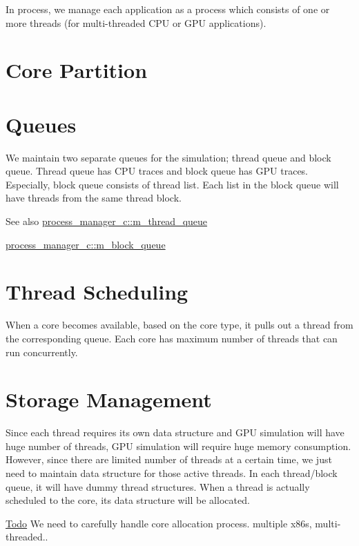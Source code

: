 In process, we manage each application as a process which consists of one or more threads (for multi-\/threaded CPU or GPU applications).\hypertarget{process_process_core}{}\section{Core Partition}\label{process_process_core}
\hypertarget{process_process_queue}{}\section{Queues}\label{process_process_queue}
We maintain two separate queues for the simulation; thread queue and block queue. Thread queue has CPU traces and block queue has GPU traces. Especially, block queue consists of thread list. Each list in the block queue will have threads from the same thread block. \begin{DoxySeeAlso}{See also}
\hyperlink{classprocess__manager__c_a0fa9dc97ed1a88aadc63b0a82ef24896}{process\_\-manager\_\-c::m\_\-thread\_\-queue} 

\hyperlink{classprocess__manager__c_a07f5bef183ba3a7f15ed362c562c1137}{process\_\-manager\_\-c::m\_\-block\_\-queue}
\end{DoxySeeAlso}
\hypertarget{process_process_schedule}{}\section{Thread Scheduling}\label{process_process_schedule}
When a core becomes available, based on the core type, it pulls out a thread from the corresponding queue. Each core has maximum number of threads that can run concurrently.\hypertarget{process_process_storage}{}\section{Storage Management}\label{process_process_storage}
Since each thread requires its own data structure and GPU simulation will have huge number of threads, GPU simulation will require huge memory consumption. However, since there are limited number of threads at a certain time, we just need to maintain data structure for those active threads. In each thread/block queue, it will have dummy thread structures. When a thread is actually scheduled to the core, its data structure will be allocated.

\begin{Desc}
\item[\hyperlink{todo__todo000002}{Todo}]We need to carefully handle core allocation process. multiple x86s, multi-\/threaded.. \end{Desc}
